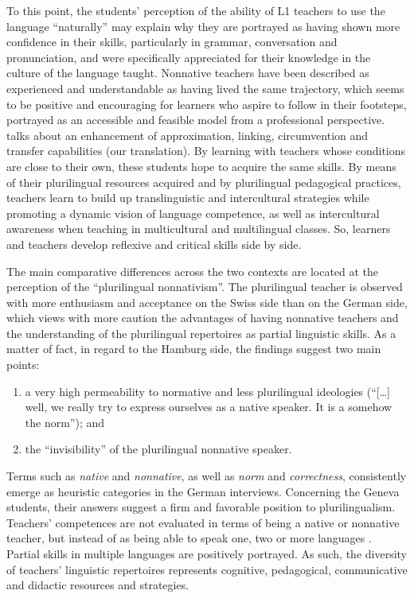 \documentclass[output=paper]{../langscibook}
\begin{document}
To this point, the students’ perception of the ability of L1 teachers to use the language “naturally” may explain why they are portrayed as having shown more confidence in their skills, particularly in grammar, conversation and pronunciation, and were specifically appreciated for their knowledge in the culture of the language taught. Nonnative teachers have been described as experienced and understandable as having lived the same trajectory, which seems to be positive and encouraging for learners who aspire to follow in their footsteps, portrayed as an accessible and feasible model from a professional perspective. \citet[46]{Castellotti2011} talks about an enhancement of approximation, linking, circumvention and transfer capabilities (our translation). By learning with teachers whose conditions are close to their own, these students hope to acquire the same skills. By means of their plurilingual resources acquired and by plurilingual pedagogical practices, teachers learn to build up translinguistic and intercultural strategies while promoting a dynamic vision of language competence, as well as intercultural awareness when teaching in multicultural and multilingual classes. So, learners and teachers develop reflexive and critical skills side by side.

The main comparative differences across the two contexts are located at the perception of the “plurilingual nonnativism”. The plurilingual teacher is observed with more enthusiasm and acceptance on the Swiss side than on the German side, which views with more caution the advantages of having nonnative teachers and the understanding of the plurilingual repertoires as partial linguistic skills. As a matter of fact, in regard to the Hamburg side, the findings suggest two main points: 

\begin{enumerate}
\item a very high permeability to normative and less plurilingual ideologies (“[…] well, we really try to express ourselves as a native speaker. It is a somehow the norm”); and 
\item the “invisibility” of the plurilingual nonnative speaker. 
\end{enumerate}

\noindent Terms such as \emph{native} and \emph{nonnative}, as well as \emph{norm} and \emph{correctness}, consistently emerge as heuristic categories in the German interviews. Concerning the Geneva students, their answers suggest a firm and favorable position to plurilingualism. Teachers’ competences are not evaluated in terms of being a native or nonnative teacher, but instead of as being able to speak one, two or more languages \citep{Bento2011}. Partial skills in multiple languages are positively portrayed. As such, the diversity of teachers’ linguistic repertoires represents cognitive, pedagogical, communicative and didactic resources and strategies.
\end{document}
